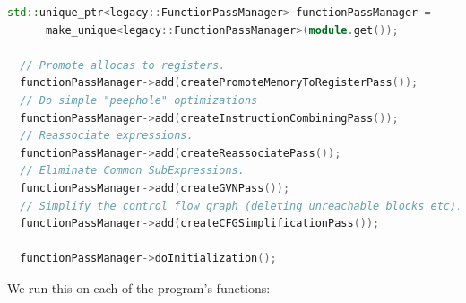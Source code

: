 %
%
%
%
%
%

%

\begin{lstlisting}[caption={ir\_codegen\_visitor.cc},language=C++]
std::unique_ptr<legacy::FunctionPassManager> functionPassManager =
      make_unique<legacy::FunctionPassManager>(module.get());

  // Promote allocas to registers.
  functionPassManager->add(createPromoteMemoryToRegisterPass());
  // Do simple "peephole" optimizations
  functionPassManager->add(createInstructionCombiningPass());
  // Reassociate expressions.
  functionPassManager->add(createReassociatePass());
  // Eliminate Common SubExpressions.
  functionPassManager->add(createGVNPass());
  // Simplify the control flow graph (deleting unreachable blocks etc).
  functionPassManager->add(createCFGSimplificationPass());

  functionPassManager->doInitialization();
\end{lstlisting}

We run this on each of the program's functions:

